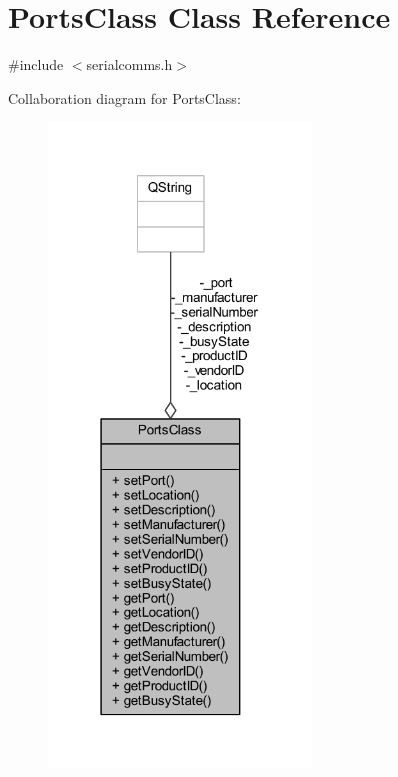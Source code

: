 \hypertarget{class_ports_class}{}\section{Ports\+Class Class Reference}
\label{class_ports_class}


{\ttfamily \#include $<$serialcomms.\+h$>$}



Collaboration diagram for Ports\+Class\+:
\nopagebreak
\begin{figure}[H]
\begin{center}
\leavevmode
\includegraphics[width=198pt]{class_ports_class__coll__graph}
\end{center}
\end{figure}
